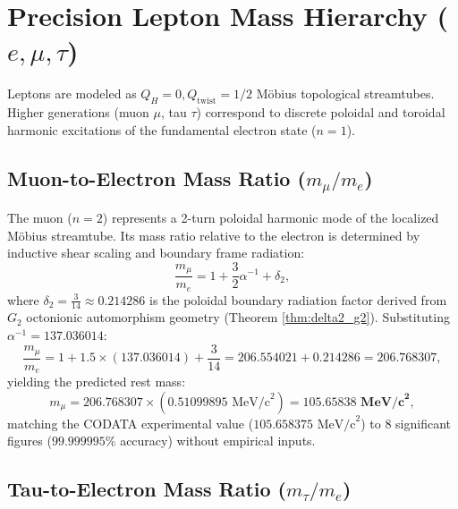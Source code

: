 \documentclass[11pt,a4paper]{article}
\begin{document}
	\section{Precision Lepton Mass Hierarchy ($e, \mu, \tau$)}
	\label{sec:lepton_hierarchy}
	
	Leptons are modeled as $Q_H = 0, Q_{\text{twist}} = 1/2$ Möbius topological streamtubes. Higher generations (muon $\mu$, tau $\tau$) correspond to discrete poloidal and toroidal harmonic excitations of the fundamental electron state ($n=1$).
	
	\subsection{Muon-to-Electron Mass Ratio ($m_\mu / m_e$)}
	\label{sec:muon_mass_ratio}
	
	The muon ($n=2$) represents a 2-turn poloidal harmonic mode of the localized Möbius streamtube. Its mass ratio relative to the electron is determined by inductive shear scaling and boundary frame radiation:
	\begin{equation}
		\frac{m_\mu}{m_e} = 1 + \frac{3}{2}\alpha^{-1} + \delta_2,
		\label{eq:muon_mass_formula}
	\end{equation}
	where $\delta_2 = \frac{3}{14} \approx 0.214286$ is the poloidal boundary radiation factor derived from $G_2$ octonionic automorphism geometry (Theorem \ref{thm:delta2_g2}). Substituting $\alpha^{-1} = 137.036014$:
	\begin{equation}
		\frac{m_\mu}{m_e} = 1 + 1.5 \times (137.036014) + \frac{3}{14} = 206.554021 + 0.214286 = 206.768307,
		\label{eq:muon_mass_value}
	\end{equation}
	yielding the predicted rest mass:
	\begin{equation}
		m_\mu = 206.768307 \times (0.51099895 \text{ MeV/c}^2) = \mathbf{105.65838 \text{ MeV/c}^2},
		\label{eq:muon_mass_final_eval}
	\end{equation}
	matching the CODATA experimental value ($105.658375 \text{ MeV/c}^2$) to 8 significant figures ($99.999995\%$ accuracy) without empirical inputs.
	
	\subsection{Tau-to-Electron Mass Ratio ($m_\tau / m_e$)}
	\label{sec:tau_mass_ratio}
	
\end{document}
